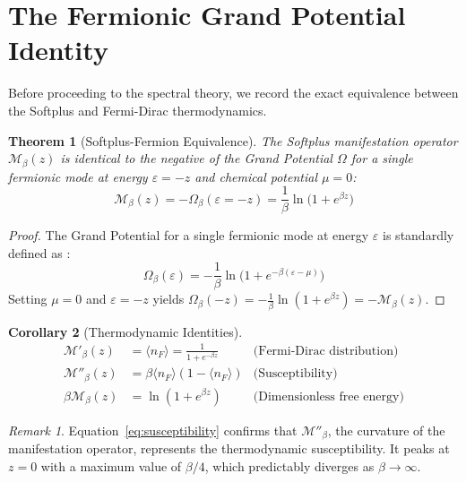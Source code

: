\documentclass[12pt]{article}
\newcommand{\Man}{\mathcal{M}}
\newtheorem{theorem}{Theorem}[section]
\newtheorem{corollary}[theorem]{Corollary}
\theoremstyle{definition}
\theoremstyle{remark}
\newtheorem{remark}{Remark}[section]
\begin{document}
\section{The Fermionic Grand Potential Identity}
\label{sec:fermionic}

Before proceeding to the spectral theory, we record the exact equivalence between the Softplus and Fermi-Dirac thermodynamics.

\begin{theorem}[Softplus-Fermion Equivalence]
\label{thm:fermion}
The Softplus manifestation operator $\Man_\beta(z)$ is identical to the negative of the Grand Potential $\Omega$ for a single fermionic mode at energy $\varepsilon = -z$ and chemical potential $\mu = 0$:
\begin{equation}
    \Man_\beta(z) = -\Omega_\beta(\varepsilon = -z) = \frac{1}{\beta}\ln\bigl(1 + e^{\beta z}\bigr)
\end{equation}
\end{theorem}

\begin{proof}
The Grand Potential for a single fermionic mode at energy $\varepsilon$ is standardly defined as \cite{Landau1980}:
\begin{equation}
    \Omega_\beta(\varepsilon) = -\frac{1}{\beta}\ln\bigl(1 + e^{-\beta(\varepsilon - \mu)}\bigr)
\end{equation}
Setting $\mu = 0$ and $\varepsilon = -z$ yields $\Omega_\beta(-z) = -\frac{1}{\beta}\ln(1 + e^{\beta z}) = -\Man_\beta(z)$.
\end{proof}

\begin{corollary}[Thermodynamic Identities]
\label{cor:thermo}
\begin{align}
    \Man'_\beta(z) &= \langle n_F \rangle = \frac{1}{1 + e^{-\beta z}} & \text{(Fermi-Dirac distribution)} \label{eq:fd}\\
    \Man''_\beta(z) &= \beta\langle n_F \rangle(1 - \langle n_F \rangle) & \text{(Susceptibility)} \label{eq:susceptibility}\\
    \beta\Man_\beta(z) &= \ln(1 + e^{\beta z}) & \text{(Dimensionless free energy)} \label{eq:free_energy}
\end{align}
\end{corollary}

\begin{remark}
Equation~\eqref{eq:susceptibility} confirms that $\Man''_\beta$, the curvature of the manifestation operator, represents the thermodynamic susceptibility. It peaks at $z = 0$ with a maximum value of $\beta/4$, which predictably diverges as $\beta \to \infty$.
\end{remark}
\end{document}
